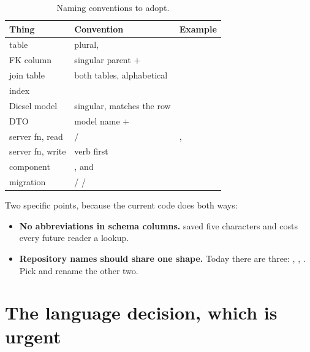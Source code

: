 \begin{table}[htbp]
\centering
\caption{Naming conventions to adopt.}
\label{tab:naming}
\small
\begin{tabular}{@{}L{0.24\textwidth}L{0.31\textwidth}L{0.36\textwidth}@{}}
\toprule
\textbf{Thing} & \textbf{Convention} & \textbf{Example} \\
\midrule
table & plural,  &  \\
FK column & singular parent $+$  &  \\
join table & both tables, alphabetical &  \\
index &  &  \\
Diesel model & singular, matches the row &  \\
DTO & model name $+$  &  \\
server fn, read &  /  & ,  \\
server fn, write & verb first &  \\
component & , and  &  \\
migration &  /  /  &  \\
\bottomrule
\end{tabular}
\end{table}

Two specific points, because the current code does both ways:

\begin{itemize}
  \item \textbf{No abbreviations in schema columns.}  saved five characters and costs
    every future reader a lookup.
  \item \textbf{Repository names should share one shape.} Today there are three:
    , ,
    . Pick  and rename the other two.
\end{itemize}

\section{The language decision, which is urgent}

